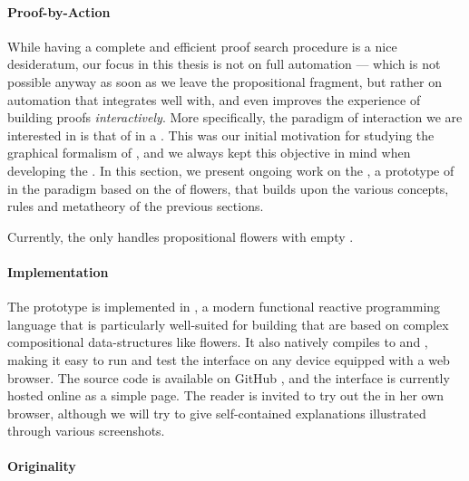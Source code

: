 \begin{scope}
\paragraph{Proof-by-Action}

While having a complete and efficient proof search procedure is a nice
desideratum, our focus in this thesis is not on full automation --- which is not
possible anyway as soon as we leave the propositional fragment, but rather on
automation that integrates well with, and even improves the experience of
building proofs \emph{interactively}. More specifically, the paradigm of
interaction we are interested in is that of \emph{} in a
. This was our initial motivation for studying the graphical formalism
of , and we always kept this objective in mind when developing the
. In this section, we present ongoing work on the , a prototype of  in the  paradigm based on
the  of flowers, that builds upon the various concepts,
rules and metatheory of the previous sections.

\begin{remark}
Currently, the  only handles propositional flowers with empty
.
\end{remark}

\paragraph{Implementation}

The prototype is implemented in  ,
a modern functional reactive programming language that is particularly
well-suited for building  that are based on complex compositional
data-structures like flowers. It also natively compiles to  and ,
making it easy to run and test the interface on any device equipped with a web
browser. The source code is available on GitHub \cite{flower-prover}, and the
interface is currently hosted online as a simple 
page.
The reader is invited to try out the  in her own browser, although
we will try to give self-contained explanations illustrated through various
screenshots.

\paragraph{Originality}


\end{scope}
